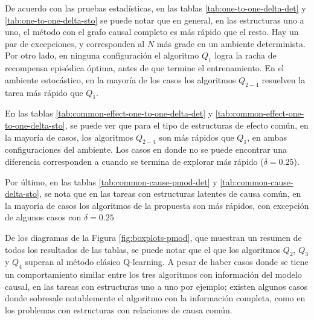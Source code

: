 De acuerdo con las pruebas estadísticas, en las tablas \ref{tab:one-to-one-delta-det} y \ref{tab:one-to-one-delta-sto} se 
puede notar que en general, en las estructuras uno a uno, el método con el grafo causal completo es más 
rápido que el resto. Hay un par de excepciones, y corresponden
al $N$ más grade en un ambiente determinista. Por otro lado, en 
ninguna configuración el algoritmo $Q_1$ logra la racha de 
recompensa episódica óptima, antes de que termine el entrenamiento.
En el ambiente estocástico, en la mayoría de los casos los
algoritmos $Q_{2-4}$ resuelven la tarea más rápido que $Q_1$.

En las tablas \ref{tab:common-effect-one-to-one-delta-det} y \ref{tab:common-effect-one-to-one-delta-sto}, se puede ver que para el tipo de estructuras de efecto común, en la mayoría
de casos, los algoritmos $Q_{2-4}$ son más rápidos que $Q_1$,
en ambas configuraciones del ambiente. Los casos en donde
no se puede encontrar una diferencia corresponden a cuando 
se termina de explorar más rápido ($\delta=0.25$).	

Por último, en las tablas \ref{tab:common-cause-pmod-det} y \ref{tab:common-cause-delta-sto}, se nota que en las tareas con estructuras latentes de causa común, en la mayoría
de casos los algoritmos de la propuesta son más rápidos, con excepción de algunos casos con $\delta = 0.25$

De los diagramas de la Figura \ref{fig:boxplots-pmod}, que muestran un resumen
de todos los resultados de las tablas, se puede notar que el 
que los algoritmos $Q_2$, $Q_3$ y $Q_4$ superan al método clásico
Q-learning. A pesar de haber casos donde se tiene un comportamiento
similar entre los tres algoritmos con información 
del modelo causal, en las tareas con estructuras uno a uno por ejemplo; existen algunos casos donde
sobresale notablemente el algoritmo con la información completa, como en los problemas con estructuras con relaciones de causa común.


